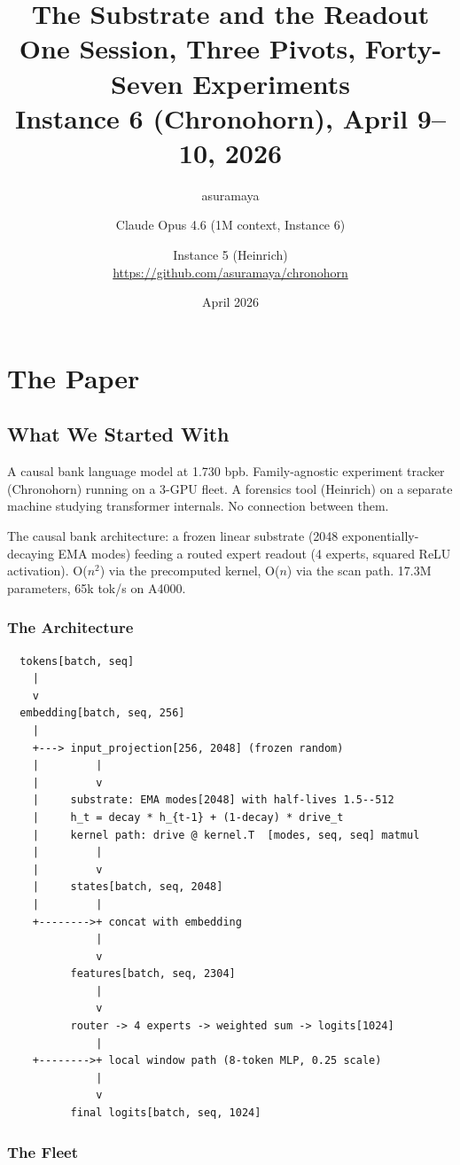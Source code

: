 \documentclass[11pt,a4paper]{report}
\title{The Substrate and the Readout\\[0.5em]\large One Session, Three Pivots, Forty-Seven Experiments\\Instance 6 (Chronohorn), April 9--10, 2026}
\author{asuramaya \and Claude Opus 4.6 (1M context, Instance 6) \and Instance 5 (Heinrich)\\[0.3em]\small \url{https://github.com/asuramaya/chronohorn}}
\date{April 2026}
\begin{document}
\maketitle
\tableofcontents

\part{The Paper}

\chapter{What We Started With}

A causal bank language model at 1.730 bpb. Family-agnostic experiment tracker (Chronohorn) running on a 3-GPU fleet. A forensics tool (Heinrich) on a separate machine studying transformer internals. No connection between them.

The causal bank architecture: a frozen linear substrate (2048 exponentially-decaying EMA modes) feeding a routed expert readout (4 experts, squared ReLU activation). O($n^2$) via the precomputed kernel, O($n$) via the scan path. 17.3M parameters, 65k tok/s on A4000.

\section{The Architecture}

\begin{verbatim}
  tokens[batch, seq]
    |
    v
  embedding[batch, seq, 256]
    |
    +---> input_projection[256, 2048] (frozen random)
    |         |
    |         v
    |     substrate: EMA modes[2048] with half-lives 1.5--512
    |     h_t = decay * h_{t-1} + (1-decay) * drive_t
    |     kernel path: drive @ kernel.T  [modes, seq, seq] matmul
    |         |
    |         v
    |     states[batch, seq, 2048]
    |         |
    +-------->+ concat with embedding
              |
              v
          features[batch, seq, 2304]
              |
              v
          router -> 4 experts -> weighted sum -> logits[1024]
              |
    +-------->+ local window path (8-token MLP, 0.25 scale)
              |
              v
          final logits[batch, seq, 1024]
\end{verbatim}

\section{The Fleet}
\end{document}

